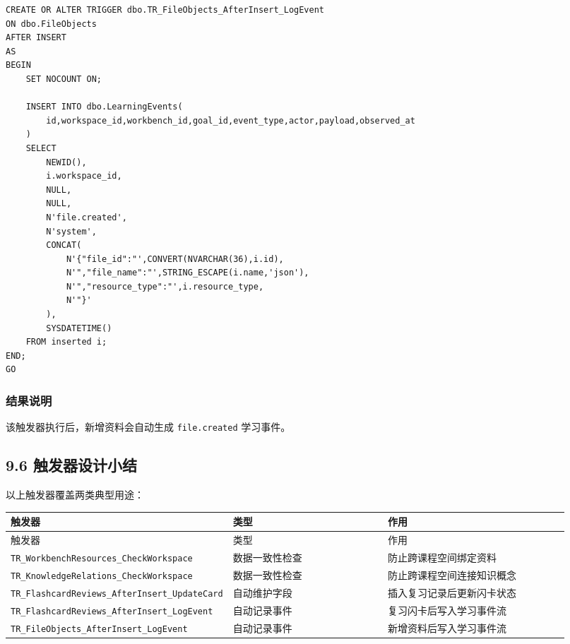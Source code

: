 \documentclass[10pt,a4paper,fontset=none]{ctexart}
\begin{document}
\begin{Verbatim}[fontsize=\scriptsize,frame=single]
CREATE OR ALTER TRIGGER dbo.TR_FileObjects_AfterInsert_LogEvent
ON dbo.FileObjects
AFTER INSERT
AS
BEGIN
    SET NOCOUNT ON;

    INSERT INTO dbo.LearningEvents(
        id,workspace_id,workbench_id,goal_id,event_type,actor,payload,observed_at
    )
    SELECT
        NEWID(),
        i.workspace_id,
        NULL,
        NULL,
        N'file.created',
        N'system',
        CONCAT(
            N'{"file_id":"',CONVERT(NVARCHAR(36),i.id),
            N'","file_name":"',STRING_ESCAPE(i.name,'json'),
            N'","resource_type":"',i.resource_type,
            N'"}'
        ),
        SYSDATETIME()
    FROM inserted i;
END;
GO
\end{Verbatim}

\subsubsection*{结果说明}

该触发器执行后，新增资料会自动生成 \texttt{file.created} 学习事件。\par

\subsection*{9.6 触发器设计小结}

以上触发器覆盖两类典型用途：\par

\begingroup\scriptsize
\renewcommand{\arraystretch}{1.18}
\setlength{\LTleft}{0pt}
\setlength{\LTright}{0pt}
\begin{longtable}{>{\raggedright\arraybackslash}p{0.18\linewidth}>{\raggedright\arraybackslash}p{0.34\linewidth}>{\raggedright\arraybackslash}p{0.40\linewidth}}
\toprule
触发器 & 类型 & 作用 \\
\midrule
\endfirsthead
\toprule
触发器 & 类型 & 作用 \\
\midrule
\endhead
\texttt{TR\_WorkbenchResources\_CheckWorkspace} & 数据一致性检查 & 防止跨课程空间绑定资料 \\
\texttt{TR\_KnowledgeRelations\_CheckWorkspace} & 数据一致性检查 & 防止跨课程空间连接知识概念 \\
\texttt{TR\_FlashcardReviews\_AfterInsert\_UpdateCard} & 自动维护字段 & 插入复习记录后更新闪卡状态 \\
\texttt{TR\_FlashcardReviews\_AfterInsert\_LogEvent} & 自动记录事件 & 复习闪卡后写入学习事件流 \\
\texttt{TR\_FileObjects\_AfterInsert\_LogEvent} & 自动记录事件 & 新增资料后写入学习事件流 \\
\bottomrule
\end{longtable}
\endgroup
\end{document}
